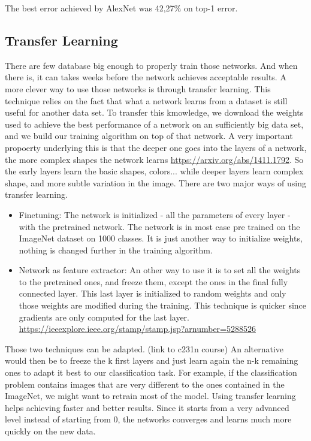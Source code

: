 The best error achieved by AlexNet was 42,27\% on top-1 error. 

\subsection{Transfer Learning}
There are few database big enough to properly train those networks. And when there is, it can takes weeks before the network achieves acceptable results. A more clever way to use those networks is through transfer learning. This technique relies on the fact that what a network learns from a dataset is still useful for another data set. To transfer this kmowledge,  we download the weights used to achieve the best performance of a network on an sufficiently big data set, and we build our training algorithm on top of that network. A very important propoerty underlying this is that the deeper one goes into the layers of a network, the more complex shapes the network learns \url{https://arxiv.org/abs/1411.1792}. So the early layers learn the basic shapes, colors... while deeper layers learn complex shape, and more subtle variation in the image. 
There are two major ways of using transfer learning. 
\begin{itemize}
    \item Finetuning: The network is initialized - all the parameters of every layer - with the pretrained network. The network is in most case pre trained on the ImageNet dataset on 1000 classes. It is just another way to initialize weights, nothing is changed further in the training algorithm.
    \item Network as feature extractor: An other way to use it is to set all the weights to the pretrained ones, and freeze them, except the ones in the final fully connected layer. This last layer is initialized to random weights and only those weights are modified during the training. 
    This technique is quicker since gradients are only computed for the last layer. \url{https://ieeexplore.ieee.org/stamp/stamp.jsp?arnumber=5288526}
\end{itemize}
Those two techniques can be adapted.  (link to c231n course) An alternative would then be to freeze the k first layers and just learn again the n-k remaining ones to adapt it best to our classification task. For example, if the classification problem contains images that are very different to the ones contained in the ImageNet, we might want to retrain most of the model. 
Using transfer learning helps achieving faster and better results. Since it starts from a very advanced level instead of starting from 0, the networks converges and learns much more quickly on the new data.